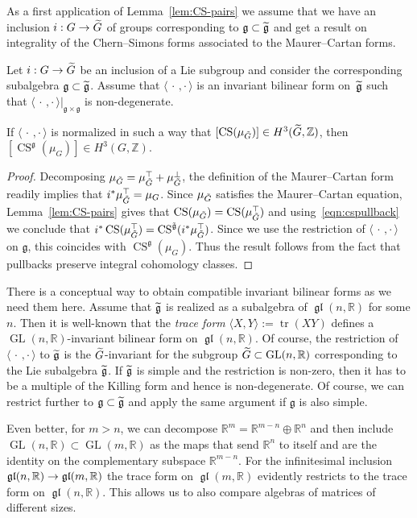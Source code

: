 \documentclass[AHL,Unicode,longabstracts]{cedram}
\newcommand{\x}{\times}
\newcommand{\B}[2]{\langle#1,#2\rangle}
\DeclareMathOperator{\CS}{CS}
\DeclareMathOperator{\GL}{GL}
\DeclareMathOperator{\tr}{tr}
\DeclareMathOperator{\fkgl}{\mathfrak{gl}}
\newcommand*{\R}{\mathbb{R}}
\newcommand{\Z}{\mathbb{Z}}
\newcommand{\fkg}{\mathfrak{g}}
\renewcommand*{\to}{\mathchoice{\longrightarrow}{\rightarrow}{\rightarrow}{\rightarrow}}
\let\oldtilde\tilde
\renewcommand*{\tilde}[1]{\mathchoice{\widetilde{#1}}{\widetilde{#1}}{\oldtilde{#1}}{\oldtilde{#1}}}
\newcommand*{\R}{\mathbb{R}}
\begin{document}
As a first application of Lemma~\ref{lem:CS-pairs} we assume that we have an inclusion $i: G\to\tilde G$ of groups corresponding to $\fkg\subset\tilde{\fkg}$ and get a result on integrality of the Chern--Simons forms associated to the Maurer--Cartan forms.

\begin{lemm}\label{lem:CS-subgroup}
Let $i: G\to\tilde G$ be an inclusion of a Lie subgroup and consider the corresponding subalgebra $\fkg\subset\tilde{\fkg}$. Assume that $\B{\,\cdot\,}{\cdot\,}$ is an invariant bilinear form on~$\tilde{\fkg}$ such that $\B{\,\cdot\,}{\cdot\,}|_{\fkg\x\fkg}$ is non-degenerate.

If $\B{\,\cdot\,}{\cdot\,}$ is normalized in such a way that $[\CS(\mu_{\tilde G})]\in H^3(\tilde G,\Z)$, then $[\CS^{\fkg}(\mu_G)]\in H^3(G,\Z)$.
\end{lemm}


\begin{proof}
Decomposing $\mu_{\tilde G}=\mu_{\tilde G}^\top+\mu_{\tilde G}^\perp$, the definition of the Maurer--Cartan form readily implies that $i^*\mu_{\tilde G}^\top=\mu_G$. Since $\mu_{\tilde G}$ satisfies the Maurer--Cartan equation, Lemma~\ref{lem:CS-pairs} gives that $\CS(\mu_{\tilde G})=\CS(\mu_{\tilde G}^\top)$ and using~\eqref{eqn:cspullback} we conclude that $i^*\CS(\mu_{\tilde G}^\top)=\CS^{\tilde{\fkg}}(i^*\mu_{\tilde G}^\top)$. Since we use the restriction of $\B{\,\cdot\,}{\cdot\,}$ on $\fkg$, this coincides with $\CS^\fkg(\mu_G)$. Thus the result follows from the fact that pullbacks preserve integral cohomology classes.
\end{proof}

There is a conceptual way to obtain compatible invariant bilinear forms as we need them here. Assume that $\tilde{\fkg}$ is realized as a subalgebra of $\fkgl(n,\R)$ for some $n$. Then it is well-known that the \emph{trace form} $\B{X}{Y}:=\tr(XY)$ defines a $\GL(n,\R)$-invariant bilinear form on $\fkgl(n,\R)$. Of course, the restriction of $\B{\,\cdot\,}{\cdot\,}$ to $\tilde{\fkg}$ is the $\tilde G$-invariant for the subgroup $\tilde G\subset \GL(n,\R)$ corresponding to the Lie subalgebra $\tilde{\fkg}$. If $\tilde{\fkg}$ is simple and the restriction is non-zero, then it has to be a multiple of the Killing form and hence is non-degenerate. Of course, we can restrict further to $\fkg\subset\tilde{\fkg}$ and apply the same argument if $\fkg$ is also simple.

Even better, for $m>n$, we can decompose $\R^m=\R^{m-n}\oplus\R^n$ and then include $\GL(n,\R)\subset \GL(m,\R)$ as the maps that send $\R^n$ to itself and are the identity on the complementary subspace $\R^{m-n}$. For the infinitesimal inclusion $\fkgl(n,\R)\to\fkgl(m,\R)$ the trace form on $\fkgl(m,\R)$ evidently restricts to the trace form on $\fkgl(n,\R)$. This allows us to also compare algebras of matrices of different sizes.
\end{document}
